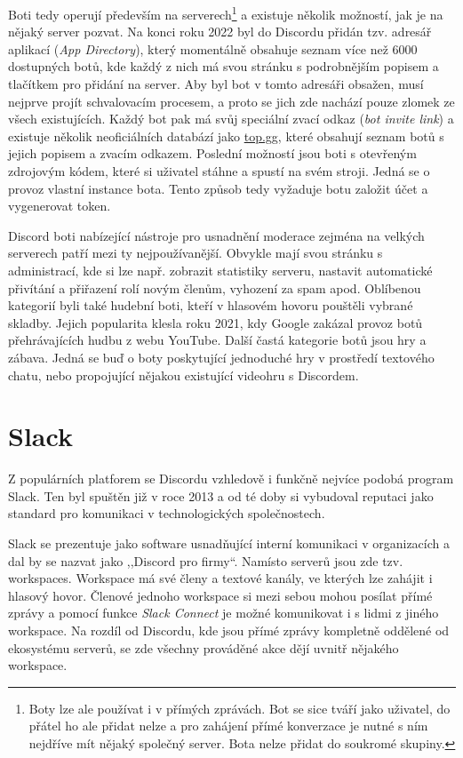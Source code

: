 \documentclass[FM]{tulthesis}
\begin{document}
	Boti tedy operují především na serverech\footnote{Boty lze ale používat i v přímých zprávách. Bot se sice tváří jako uživatel, do přátel ho ale přidat nelze a pro zahájení přímé konverzace je nutné s ním nejdříve mít nějaký společný server. Bota nelze přidat do soukromé skupiny.} a existuje několik možností, jak je na nějaký server pozvat. Na konci roku 2022 byl do Discordu přidán tzv. adresář aplikací (\textit{App Directory}), který momentálně obsahuje seznam více než 6000 dostupných botů, kde každý z nich má svou stránku s podrobnějším popisem a tlačítkem pro přidání na server. Aby byl bot v tomto adresáři obsažen, musí nejprve projít schvalovacím procesem, a proto se jich zde nachází pouze zlomek ze všech existujících. Každý bot pak má svůj speciální zvací odkaz (\textit{bot invite link}) a existuje několik neoficiálních databází jako \href{https://top.gg}{top.gg}, které obsahují seznam botů s jejich popisem a zvacím odkazem. Poslední možností jsou boti s otevřeným zdrojovým kódem, které si uživatel stáhne a spustí na svém stroji. Jedná se o provoz vlastní instance bota. Tento způsob tedy vyžaduje botu založit účet a vygenerovat token.
	
	Discord boti nabízející nástroje pro usnadnění moderace zejména na velkých serverech patří mezi ty nejpoužívanější. Obvykle mají svou stránku s administrací, kde si lze např. zobrazit statistiky serveru, nastavit automatické přivítání a přiřazení rolí novým členům, vyhození za spam apod. Oblíbenou kategorií byli také hudební boti, kteří v hlasovém hovoru pouštěli vybrané skladby. Jejich popularita klesla roku 2021, kdy Google zakázal provoz botů přehrávajících hudbu z webu \mbox{YouTube}. Další častá kategorie botů jsou hry a zábava. Jedná se buď o boty poskytující jednoduché hry v prostředí textového chatu, nebo propojující nějakou existující videohru s Discordem.
	
	\section{Slack}
	
	Z populárních platforem se Discordu vzhledově i funkčně nejvíce podobá program Slack. Ten byl spuštěn již v roce 2013 a od té doby si vybudoval reputaci jako standard pro komunikaci v technologických společnostech. \cite{lit_Discord}
	
	Slack se prezentuje jako software usnadňující interní komunikaci v organizacích a dal by se nazvat jako ,,Discord pro firmy``. Namísto serverů jsou zde tzv. workspaces. Workspace má své členy a textové kanály, ve kterých lze zahájit i hlasový hovor. Členové jednoho workspace si mezi sebou mohou posílat přímé zprávy a pomocí funkce \textit{Slack Connect} je možné komunikovat i s lidmi z jiného workspace. Na rozdíl od Discordu, kde jsou přímé zprávy kompletně oddělené od ekosystému serverů, se zde všechny prováděné akce dějí uvnitř nějakého workspace.
	
\end{document}
